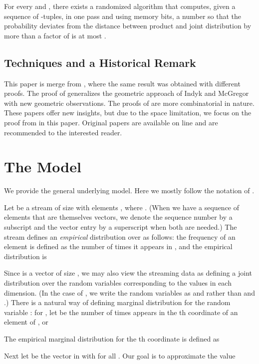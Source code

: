 \def\draft{0}  \documentclass[proceedings]{stacs}
\theoremstyle{plain}\newtheorem{satz}[thm]{Satz}
\theoremstyle{definition}\newtheorem{crucial}[thm]{Crucial Definition}
\begin{document}
\begin{corollary}
For every  and , there exists a randomized algorithm that computes,
given a sequence  of -tuples, in one pass and using
 memory bits,
a number  so that the probability  deviates from the 
distance between product and joint distribution by more than a factor of
 is at most .
\end{corollary}

\subsection{Techniques and a Historical Remark}

This paper is merge from \cite{BO01, BO02, CLM}, where the same result was obtained with different
proofs. The proof of \cite{CLM} generalizes the geometric approach of
Indyk and McGregor \cite{IM08} with new geometric observations.  The
proofs of \cite{BO01,BO02} are more combinatorial in nature. These papers
offer new insights, but due to the space limitation, we focus
on the proof from \cite{BO02} in this paper. Original papers are
available on line and are recommended to the interested reader.

\section{The Model}
We provide the general underlying model.  Here we mostly follow the notation of \cite{BO01,IM08}.

Let  be a stream of size  with elements , where
.
(When we have a sequence of elements that are themselves vectors, we
denote the sequence number by a subscript and the vector entry by a
superscript when both are needed.)
The stream  defines an
\emph{empirical} distribution over  as follows: the frequency
 of an element  is defined as the number
of times it appears in , and the empirical distribution is


Since  is a vector of size , we
may also view the streaming data as defining a joint distribution over
the random variables  corresponding to the values in
each dimension. (In the case of , we write the random variables
as  and  rather than  and .) There is a natural way of
defining marginal distribution for the random variable : for
, let  be the number of times
 appears in the th coordinate of an element of ,
or

The empirical marginal distribution   for the th coordinate is defined as


Next let  be the vector in  with  for all . Our goal is to approximate the value
\end{document}
